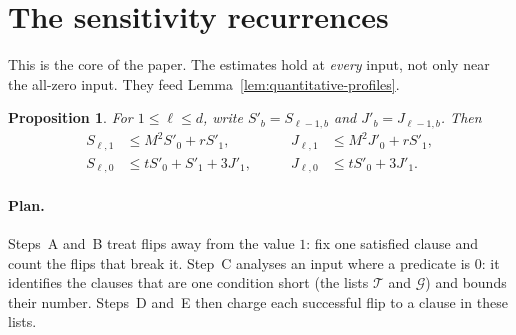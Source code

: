 \documentclass[11pt]{article}
\newtheorem{proposition}[theorem]{Proposition}
\theoremstyle{definition}
\theoremstyle{remark}
\begin{document}
\section{The sensitivity recurrences}
\label{sec:recurrences}

This is the core of the paper. The estimates hold at \emph{every} input, not
only near the all-zero input. They feed
Lemma~\ref{lem:quantitative-profiles}.

\begin{proposition}\label{prop:recurrences}
For \(1\leq \ell\leq d\), write
\(S'_b=S_{\ell-1,b}\) and \(J'_b=J_{\ell-1,b}\).  Then
\begin{equation}\label{eq:recurrences}
\begin{aligned}
 S_{\ell,1}&\leq M^2S'_0+rS'_1,
 &\qquad J_{\ell,1}&\leq M^2J'_0+rS'_1,\\
 S_{\ell,0}&\leq tS'_0+S'_1+3J'_1,
 &\qquad J_{\ell,0}&\leq tS'_0+3J'_1.
\end{aligned}
\end{equation}
\end{proposition}

\paragraph{Plan.}
Steps~A and~B treat flips away from the value \(1\): fix one satisfied
clause and count the flips that break it. Step~C analyses an input where a
predicate is \(0\): it identifies the clauses that are one condition short
(the lists \(\mathcal T\) and \(\mathcal G\)) and bounds their number.
Steps~D and~E then charge each successful flip to a clause in these lists.
\end{document}
